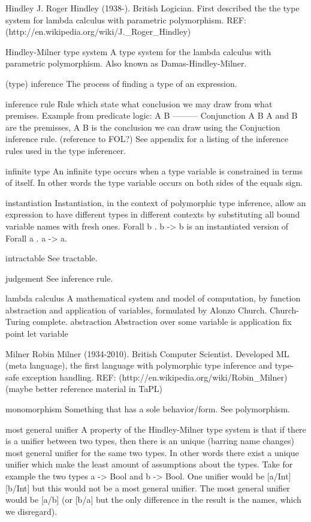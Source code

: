 Hindley
J. Roger Hindley (1938-). British Logician. First described the the type system for lambda calculus with parametric polymorphism. REF: (http://en.wikipedia.org/wiki/J._Roger_Hindley)

Hindley-Milner type system
A type system for the lambda calculus with parametric polymorphism. Also known as Damas-Hindley-Milner.

(type) inference
The process of finding a type of an expression. 

inference rule
Rule which state what conclusion we may draw from what premises.
Example from predicate logic:
A       B
--------- Conjunction
A \land B
A and B are the premisses, A \land B is the conclusion we can draw using the Conjuction inference rule.
(reference to FOL?)
See appendix for a listing of the inference rules used in the type inferencer.

infinite type
An infinite type occurs when a type variable is constrained in terms of itself. In other words the type variable occurs on both sides of the equals sign.

instantiation
Instantiation, in the context of polymorphic type inference, allow an expression to have different types in different contexts by substituting all bound variable names with fresh ones. Forall b . b -> b is an instantiated version of Forall a . a -> a.

intractable
See tractable.

judgement
See inference rule.

lambda calculus
A mathematical system and model of computation, by function abstraction and application of variables, formulated by Alonzo Church. Church-Turing complete. 
  abstraction
    Abstraction over some variable is
  application
  fix point
  let
  variable

Milner
Robin Milner (1934-2010). British Computer Scientist. Developed ML (meta language), the first language with polymorphic type inference and type-safe exception handling. REF: (http://en.wikipedia.org/wiki/Robin\_Milner)
(maybe better reference material in TaPL)

monomorphism
Something that has a sole behavior/form. See polymorphism. 

most general unifier
A property of the Hindley-Milner type system is that if there is a unifier between two types, then there is an unique (barring name changes) most general unifier for the same two types. In other words there exist a unique unifier which make the least amount of assumptions about the types.
Take for example the two types a -> Bool and b -> Bool. One unifier would be
[a/Int][b/Int] but this would not be a most general unifier. The most general unifier would be [a/b] (or [b/a] but the only difference in the result is the names, which we disregard).

